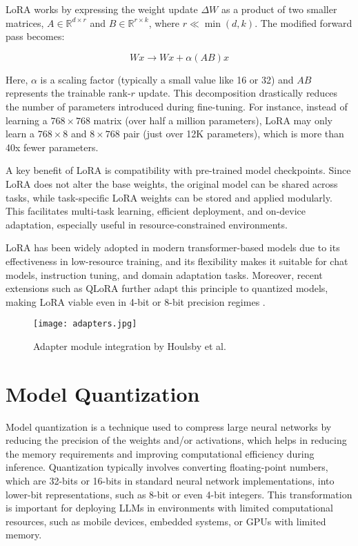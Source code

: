 LoRA works by expressing the weight update $\Delta W$ as a product of two smaller matrices,
$A \in \mathbb{R}^{d \times r}$ and $B \in \mathbb{R}^{r \times k}$, where $r \ll \min(d, k)$. The modified forward pass becomes:

\begin{equation}
  W x \rightarrow W x + \alpha (AB) x
  \label{lorapass}
\end{equation}

Here, $\alpha$ is a scaling factor (typically a small value like 16 or 32) and $AB$ represents the
trainable rank-$r$ update. This decomposition drastically reduces the number of parameters
introduced during fine-tuning. For instance, instead of learning a $768 \times 768$ matrix (over
half a million parameters), LoRA may only learn a $768 \times 8$ and $8 \times 768$ pair (just over
12K parameters), which is more than 40x fewer parameters.

A key benefit of LoRA is compatibility with pre-trained model checkpoints. Since
LoRA does not alter the base weights, the original model can be shared across tasks,
while task-specific LoRA weights can be stored and applied modularly. This facilitates
multi-task learning, efficient deployment, and on-device adaptation, especially useful in
resource-constrained environments.

LoRA has been widely adopted in modern transformer-based models due to its effectiveness
in low-resource training, and its flexibility makes it suitable for chat models,
instruction tuning, and domain adaptation tasks. Moreover, recent extensions such as
QLoRA further adapt this principle to quantized models, making LoRA viable even in
4-bit or 8-bit precision regimes \cite{dettmers2023qlora}.

\begin{figure}[H]
  \centering
  \texttt{[image: adapters.jpg]}
  \caption{Adapter module integration by Houlsby et al. \cite{houlsby2019parameter}}
\end{figure}

\section{Model Quantization}

Model quantization is a technique used to compress large neural networks by reducing the
precision of the weights and/or activations, which helps in reducing the memory requirements
and improving computational efficiency during inference. Quantization typically
involves converting floating-point numbers, which are 32-bits or 16-bits in standard neural
network implementations, into lower-bit representations, such as 8-bit or even 4-bit
integers. This transformation is important for deploying LLMs in environments with limited
computational resources, such as mobile devices, embedded systems, or GPUs with
limited memory.

